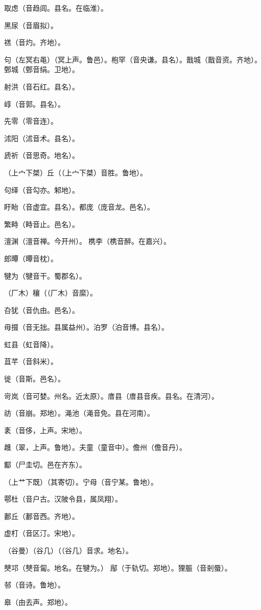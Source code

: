\documentclass[a4paper,12pt,UTF8,twoside]{ctexbook}
\begin{document}
	取虑（音趋闾。县名。在临淮）。
	
	黑尿（音眉拟）。
	
	禚（音灼。齐地）。
	
	句（左冥右黾）（冥上声。鲁邑）。枹罕（音央谦。县名）。戬城（戬音资。齐地）。鄄城（鄄音绢。卫地）。
	
	射洪（音石红。县名）。
	
	崞（音郭。县名）。
	
	先零（零音连）。
	
	沭阳（沭音术。县名）。
	
	虒祈（音思奇。地名）。
	
	（上宀下桀）丘（（上宀下桀）音胜。鲁地）。
	
	句绎（音勾亦。邾地）。
	
	盱眙（音虚宜。县名）。都庞（庞音龙。邑名）。
	
	繁畤（畤音止。邑名）。
	
	澶渊（澶音禅。今开州）。槜李（槜音醉。在嘉兴）。
	
	郎曋（曋音枕）。
	
	犍为（犍音干。蜀郡名）。
	
	（厂木）穰（（厂木）音縻）。
	
	叴犹（音仇由。邑名）。
	
	毋掇（音无拙。县属益州）。泊罗（泊音博。县名）。
	
	虹县（虹音降）。
	
	苴芊（音斜米）。
	
	徙（音斯。邑名）。
	
	岢岚（音可婪。州名。近太原）。庴县（庴县音疾。县名。在清河）。
	
	祊（音崩。郑地）。渑池（渑音免。县在河南）。
	
	袲（音侈，上声。宋地）。
	
	趡（翠，上声。鲁地）。夫童（童音中）。儋州（儋音丹）。
	
	酅（尸圭切。邑在齐东）。
	
	（上艹下既）（其寄切）。宁母（音宁某。鲁地）。
	
	鄠杜（音户古。汉陂令县，属凤翔）。
	
	郪丘（郪音西。齐地）。
	
	虚朾（音区汀。宋地）。
	
	（谷曼）（谷几）（（谷几）音求。地名）。
	
	僰邛（僰音匐。地名。在犍为。） 鄬（于轨切。郑地）。狸脤（音剎蜃）。
	
	邿（音诗。鲁地）。
	
	皋（由去声。郑地）。
	
\end{document}
